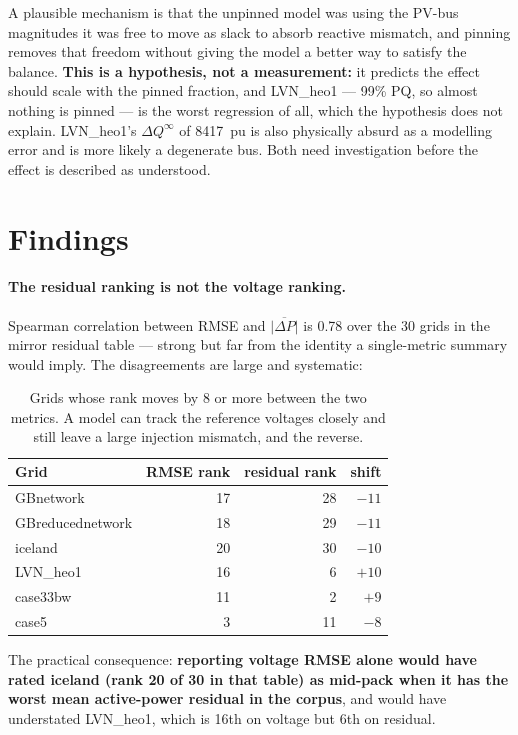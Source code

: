 \documentclass[10pt]{article}
\begin{document}
A plausible mechanism is that the unpinned model was using the PV-bus magnitudes
it was free to move as slack to absorb reactive mismatch, and pinning removes
that freedom without giving the model a better way to satisfy the balance.
\textbf{This is a hypothesis, not a measurement:} it predicts the effect should
scale with the pinned fraction, and LVN\_heo1 --- 99\% PQ, so almost nothing is
pinned --- is the worst regression of all, which the hypothesis does not
explain. LVN\_heo1's $\Delta Q^{\infty}$ of 8417~pu is also physically absurd
as a modelling error and is more likely a degenerate bus. Both need
investigation before the effect is described as understood.

\section{Findings}

\paragraph{The residual ranking is not the voltage ranking.} Spearman
correlation between RMSE and $\overline{|\Delta P|}$ is 0.78 over the 30 grids
in the mirror residual table --- strong but far from the identity a single-metric summary would imply.
The disagreements are large and systematic:

\begin{table}[H]
\centering
\small
\begin{tabular}{lrrr}
\toprule
Grid & RMSE rank & residual rank & shift \\
\midrule
GBnetwork        & 17 & 28 & $-11$ \\
GBreducednetwork & 18 & 29 & $-11$ \\
iceland          & 20 & 30 & $-10$ \\
LVN\_heo1        & 16 &  6 & $+10$ \\
case33bw         & 11 &  2 & $+9$ \\
case5            &  3 & 11 & $-8$ \\
\bottomrule
\end{tabular}
\caption{Grids whose rank moves by 8 or more between the two metrics. A model
can track the reference voltages closely and still leave a large injection
mismatch, and the reverse.}
\end{table}

The practical consequence: \textbf{reporting voltage RMSE alone would have rated
iceland (rank 20 of 30 in that table) as mid-pack when it has the worst mean active-power
residual in the corpus}, and would have understated LVN\_heo1, which is 16th on
voltage but 6th on residual.
\end{document}

